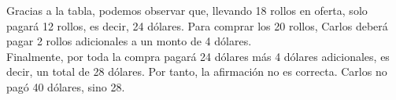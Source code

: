 Gracias a la tabla, podemos observar que, llevando 18 rollos en oferta, solo pagará 12 rollos, es decir, 24 dólares.
Para comprar los 20 rollos, Carlos deberá pagar 2 rollos adicionales a un monto de 4 dólares.\\

Finalmente, por toda la compra pagará 24 dólares más 4 dólares adicionales, es decir, un total de 28 dólares.
Por tanto, la afirmación no es correcta. Carlos no pagó 40 dólares, sino 28.\\